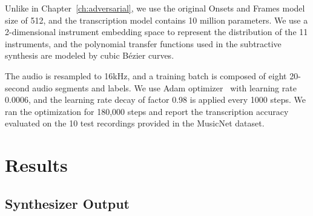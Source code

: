 Unlike in Chapter~\ref{ch:adversarial}, we use the original Onsets and Frames model size of 512, and the transcription model contains 10 million parameters.
We use a 2-dimensional instrument embedding space to represent the distribution of the 11 instruments, and the polynomial transfer functions used in the subtractive synthesis are modeled by cubic B\'{e}zier curves.


The audio is resampled to 16kHz, and a training batch is composed of eight 20-second audio segments and labels.
We use Adam optimizer~\cite{kingma2015adam} with learning rate 0.0006, and the learning rate decay of factor 0.98 is applied every 1000 steps.
We ran the optimization for 180,000 steps and report the transcription accuracy evaluated on the 10 test recordings provided in the MusicNet dataset.

\section{Results}

\subsection{Synthesizer Output}

